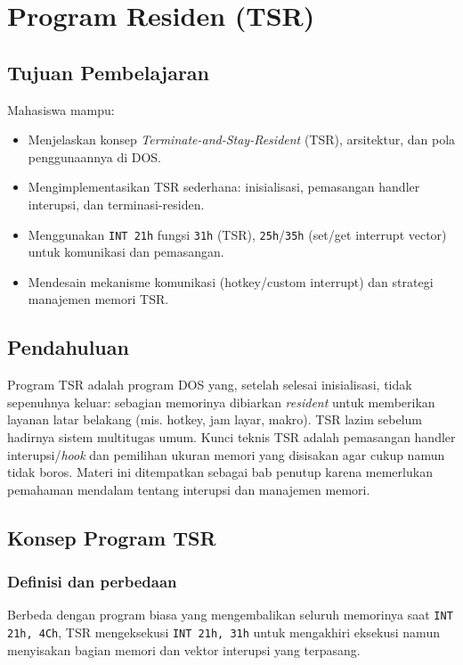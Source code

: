 \documentclass[../main.tex]{subfiles}
\begin{document}
\chapter{Program Residen (TSR)}

    \section{Tujuan Pembelajaran}
        Mahasiswa mampu:
        \begin{itemize}
            \item Menjelaskan konsep \textit{Terminate-and-Stay-Resident} (TSR), arsitektur, dan pola penggunaannya di DOS.
            \item Mengimplementasikan TSR sederhana: inisialisasi, pemasangan handler interupsi, dan terminasi-residen.
            \item Menggunakan \texttt{INT 21h} fungsi \texttt{31h} (TSR), \texttt{25h}/\texttt{35h} (set/get interrupt vector) untuk komunikasi dan pemasangan.
            \item Mendesain mekanisme komunikasi (hotkey/custom interrupt) dan strategi manajemen memori TSR.
        \end{itemize}

    \section{Pendahuluan}
        Program TSR adalah program DOS yang, setelah selesai inisialisasi, tidak sepenuhnya keluar: sebagian memorinya dibiarkan \textit{resident} untuk memberikan layanan latar belakang (mis. hotkey, jam layar, makro). TSR lazim sebelum hadirnya sistem multitugas umum. Kunci teknis TSR adalah pemasangan handler interupsi/\textit{hook} dan pemilihan ukuran memori yang disisakan agar cukup namun tidak boros. Materi ini ditempatkan sebagai bab penutup karena memerlukan pemahaman mendalam tentang interupsi dan manajemen memori.

    \section{Konsep Program TSR}
        \subsection{Definisi dan perbedaan}
            Berbeda dengan program biasa yang mengembalikan seluruh memorinya saat \texttt{INT 21h, 4Ch}, TSR mengeksekusi \texttt{INT 21h, 31h} untuk mengakhiri eksekusi namun menyisakan bagian memori dan vektor interupsi yang terpasang.
\end{document}

